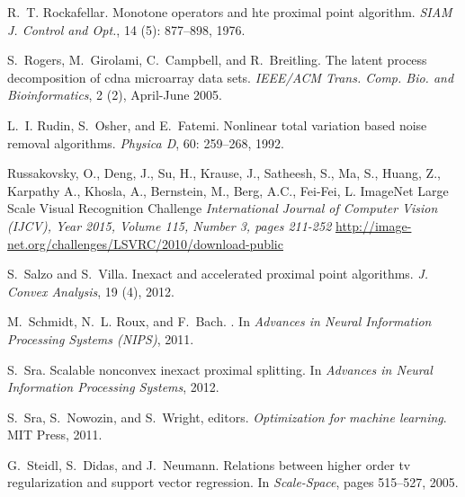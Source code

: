 \documentclass[twoside,11pt]{article}
\numberwithin{equation}{section}
\numberwithin{theorem}{section}
\begin{document}
\begin{thebibliography}{86}
R.~T. Rockafellar.
\newblock Monotone operators and hte proximal point algorithm.
\newblock \emph{SIAM J. Control and Opt.}, 14 (5): 877--898,
  1976.

S.~Rogers, M.~Girolami, C.~Campbell, and R.~Breitling.
\newblock The latent process decomposition of cdna microarray data sets.
\newblock \emph{IEEE/ACM Trans. Comp. Bio. and Bioinformatics}, 2 (2),
  April-June 2005.

L.~I. Rudin, S.~Osher, and E.~Fatemi.
\newblock Nonlinear total variation based noise removal algorithms.
\newblock \emph{Physica D}, 60: 259--268, 1992.

Russakovsky, O., Deng, J., Su, H., Krause, J., Satheesh, S., Ma, S., Huang, Z., Karpathy A., Khosla, A., Bernstein, M., Berg, A.C., Fei-Fei, L.
\newblock ImageNet Large Scale Visual Recognition Challenge
\newblock \emph{International Journal of Computer Vision (IJCV), Year 2015, Volume 115, Number 3, pages 211-252}
\newblock \url{http://image-net.org/challenges/LSVRC/2010/download-public}

S.~Salzo and S.~Villa.
\newblock Inexact and accelerated proximal point algorithms.
\newblock \emph{J. Convex Analysis}, 19 (4), 2012.

M.~Schmidt, N.~L. Roux, and F.~Bach.
.
\newblock In \emph{Advances in Neural Information Processing Systems (NIPS)},
  2011.

S.~Sra.
\newblock Scalable nonconvex inexact proximal splitting.
\newblock In \emph{Advances in Neural Information Processing Systems}, 2012.

S.~Sra, S.~Nowozin, and S.~Wright, editors.
\newblock \emph{Optimization for machine learning}.
\newblock MIT Press, 2011.

G.~Steidl, S.~Didas, and J.~Neumann.
\newblock Relations between higher order tv regularization and support vector
  regression.
\newblock In \emph{Scale-Space}, pages 515--527, 2005.


\end{thebibliography}
\end{document}
